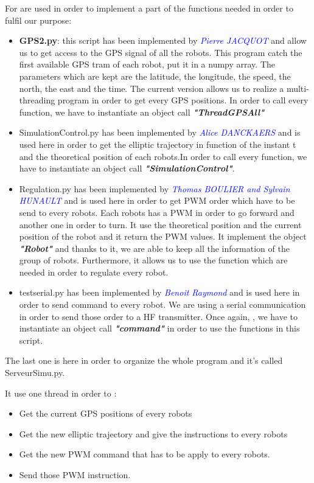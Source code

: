 For are used in order to implement a part of the functions needed in order to fulfil our purpose:
\begin{itemize}

\item \textbf{GPS2.py}: this script has been implemented by \textcolor{blue}{\textit{Pierre JACQUOT}} and allow us to get access to the GPS signal of all the robots. This program catch the first available GPS tram of each robot, put it in a numpy array. The parameters which are kept are the latitude, the longitude, the speed, the north, the east and the time. The current version allows us to realize a multi-threading program in order to get every GPS positions. In order to call every function, we have to instantiate an object call \textbf{\textit{"ThreadGPSAll"}}
\item SimulationControl.py has been implemented by  \textcolor{blue}{\textit{Alice DANCKAERS}} and is used here in order to get the elliptic trajectory in function of the instant t and the theoretical position of each robots.In order to call every function, we have to instantiate an object call \textbf{\textit{"SimulationControl"}}.
\item Regulation.py has been implemented by  \textcolor{blue}{\textit{Thomas BOULIER and Sylvain HUNAULT}} and is used here in order to get PWM order which have to be send to every robots. Each robots has a PWM in order to go forward and another one in order to turn. It use the theoretical position and the current position of the robot and it return the PWM values. It implement the object \textbf{\textit{"Robot"}} and thanks to it, we are able to keep all the information of the group of robots. Furthermore, it allows us to use the function which are needed in order to regulate every robot. 
\item testserial.py has been implemented by  \textcolor{blue}{\textit{Benoit Raymond }} and is used here in order to send command to every robot. We are using a serial communication in order to send those order to a HF transmitter. Once again, , we have to instantiate an object call \textbf{\textit{"command"}} in order to use the functions in this script.

\end{itemize}

The last one is here in order to organize the whole program and it's called ServeurSimu.py.

It use one thread in order to :
\begin{itemize}
\item Get the current GPS positions of every robots
\item Get the new elliptic trajectory and give the instructions to every robots
\item Get the new PWM command that has to be apply to every robots.
\item Send those PWM instruction. 
\end{itemize}

